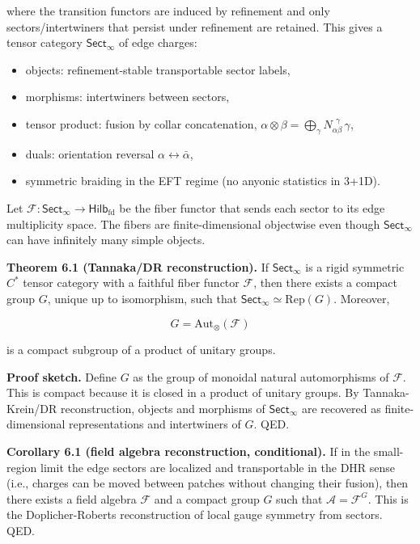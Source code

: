 where the transition functors are induced by refinement and only sectors/intertwiners that persist under refinement are retained. This gives a tensor category \(\mathsf{Sect}_\infty\) of edge charges:

\begin{itemize}
\tightlist
\item
  objects: refinement-stable transportable sector labels,
\item
  morphisms: intertwiners between sectors,
\item
  tensor product: fusion by collar concatenation, \(\alpha \otimes \beta = \bigoplus_\gamma N_{\alpha\beta}^{\ \ \gamma}\,\gamma\),
\item
  duals: orientation reversal \(\alpha \leftrightarrow \bar\alpha\),
\item
  symmetric braiding in the EFT regime (no anyonic statistics in 3+1D).
\end{itemize}

Let \(\mathcal F: \mathsf{Sect}_\infty \to \mathsf{Hilb}_{\mathrm{fd}}\) be the fiber functor that sends each sector to its edge multiplicity space. The fibers are finite-dimensional objectwise even though \(\mathsf{Sect}_\infty\) can have infinitely many simple objects.

\textbf{Theorem 6.1 (Tannaka/DR reconstruction).} If \(\mathsf{Sect}_\infty\) is a rigid symmetric \(C^*\) tensor category with a faithful fiber functor \(\mathcal F\), then there exists a compact group \(G\), unique up to isomorphism, such that \(\mathsf{Sect}_\infty \simeq \mathrm{Rep}(G)\). Moreover,

\[
G = \mathrm{Aut}_\otimes(\mathcal F)
\]

is a compact subgroup of a product of unitary groups.

\textbf{Proof sketch.} Define \(G\) as the group of monoidal natural automorphisms of \(\mathcal F\). This is compact because it is closed in a product of unitary groups. By Tannaka-Krein/DR reconstruction, objects and morphisms of \(\mathsf{Sect}_\infty\) are recovered as finite-dimensional representations and intertwiners of \(G\). QED.

\textbf{Corollary 6.1 (field algebra reconstruction, conditional).} If in the small-region limit the edge sectors are localized and transportable in the DHR sense (i.e., charges can be moved between patches without changing their fusion), then there exists a field algebra \(\mathcal F\) and a compact group \(G\) such that \(\mathcal A = \mathcal F^G\). This is the Doplicher-Roberts reconstruction of local gauge symmetry from sectors. QED.

